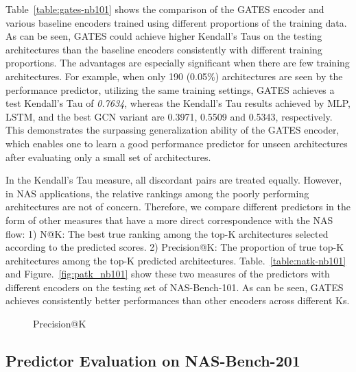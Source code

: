 \documentclass[runningheads]{llncs}
\begin{document}
Table~\ref{table:gates-nb101} shows the comparison of the GATES encoder and various baseline encoders trained using different proportions of the training data. 
As can be seen, GATES could achieve higher Kendall's Taus on the testing architectures than the baseline encoders consistently with different training proportions. The advantages are especially significant when there are few training architectures. For example, when only 190 (0.05\%) architectures are seen by the performance predictor, utilizing the same training settings, GATES achieves a test Kendall's Tau of \textit{0.7634},
whereas the Kendall's Tau results achieved by MLP, LSTM, and the best GCN variant are 0.3971, 0.5509 and 0.5343, respectively. This demonstrates the surpassing generalization ability of the GATES encoder, which enables one to learn a good performance predictor for unseen architectures after evaluating only a small set of architectures.


In the Kendall's Tau measure, all discordant pairs are treated equally. However, in NAS applications, the relative rankings among the poorly performing architectures are not of concern. Therefore, we compare different predictors in the form of other measures that have a more direct correspondence with the NAS flow: 1) N@K: The best true ranking among the top-K architectures selected according to the predicted scores. 2) Precision@K: The proportion of true top-K architectures among the top-K predicted architectures. Table.~\ref{table:natk-nb101} and Figure.~\ref{fig:patk_nb101} show these two measures of the predictors with different encoders on the testing set of NAS-Bench-101. As can be seen, GATES achieves consistently better performances than other encoders across different Ks.

\begin{figure*}[tb]
  \begin{center}
    \caption{Precision@K}
  \end{center}
  \label{fig:patk}
\end{figure*}


\subsection{Predictor Evaluation on NAS-Bench-201}
\label{sec:exp-nasbench201}
\end{document}

